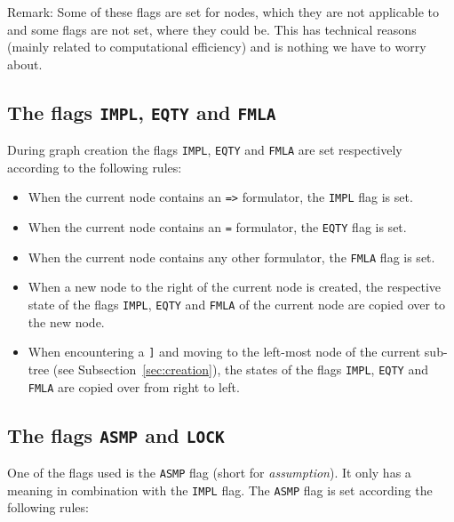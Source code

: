 \documentclass[british]{article}
\newcommand\prv{bc}
\newcommand\m[1]{\texttt{#1}}
\begin{document}
Remark: Some of these flags are set for nodes, which they are not applicable to
and some flags are not set, where they could be.
This has technical reasons (mainly related to computational efficiency) and is
nothing we have to worry about.

\pagebreak{}

\subsection{The flags \texttt{IMPL}, \texttt{EQTY} and \texttt{FMLA}}
During graph creation the flags \texttt{IMPL},
\texttt{EQTY} and \texttt{FMLA} are set respectively according to the following
rules:

\begin{itemize}
	\item
		When the current node contains an \m{=>} formulator, the \texttt{IMPL}
		flag is set.
	\item
		When the current node contains an \m{=} formulator, the \texttt{EQTY}
		flag is set.
	\item
		When the current node contains any other formulator, the \texttt{FMLA}
		flag is set.
	\item
		When a new node to the right of the current node is created, the
		respective state of the flags \texttt{IMPL}, \texttt{EQTY} and
		\texttt{FMLA} of the current node are copied over to the new node.
	\item
		When encountering a \m{]} and moving to the left-most node of the
		current sub-tree (see Subsection~\ref{sec:creation}), the states of the
		flags \texttt{IMPL}, \texttt{EQTY} and \texttt{FMLA} are copied over
		from right to left.
\end{itemize}

\subsection{The flags \texttt{ASMP} and \texttt{LOCK}}

One of the flags used is the \texttt{ASMP} flag (short for \emph{assumption}).
It only has a meaning in combination with the \texttt{IMPL} flag. 
\medskip
The \texttt{ASMP} flag is set according the following rules:
\end{document}
